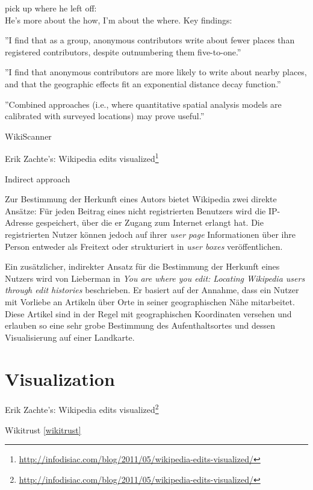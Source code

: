 
\begin{todos}
    \item pick up where he left off:  
    \\ He's more about the how, I'm about the where. Key findings:
    \item ''I find that as a group, anonymous contributors write about fewer places than registered contributors, despite outnumbering them five-to-one.'' \cite{hardy2011volunteered}
    \item ''I find that anonymous contributors are more likely to write about
nearby places, and that the geographic effects fit an exponential distance decay
function.'' \cite{hardy2011volunteered}
    \item ''Combined approaches (i.e., where quantitative spatial analysis models
are calibrated with surveyed locations) may prove useful.''  \cite[p. 85]{hardy2011volunteered}
    \item WikiScanner
    \item Erik Zachte's: Wikipedia edits visualized\footnote{\url{http://infodisiac.com/blog/2011/05/wikipedia-edits-visualized/}}
    \item Indirect approach 
\end{todos}

Zur Bestimmung der Herkunft eines Autors bietet Wikipedia zwei direkte Ansätze: 
Für jeden Beitrag eines nicht registrierten Benutzers wird die IP-Adresse gespeichert, über die er Zugang zum Internet erlangt hat. 
Die registrierten Nutzer können jedoch auf ihrer \emph{user page} Informationen über ihre Person entweder als Freitext oder strukturiert in \emph{user boxes} veröffentlichen.

Ein zusätzlicher, indirekter Ansatz für die Bestimmung der Herkunft eines Nutzers wird von Lieberman in \emph{You are where you edit: Locating Wikipedia users through edit histories}\cite{lieberman2009you} beschrieben.
Er basiert auf der Annahme, dass ein Nutzer mit Vorliebe an Artikeln über Orte in seiner geographischen Nähe mitarbeitet. 
Diese Artikel sind in der Regel mit geographischen Koordinaten versehen und erlauben so eine sehr grobe Bestimmung des Aufenthaltsortes und dessen Visualisierung auf einer Landkarte.


\section{Visualization}\label{sec:visualization}


\begin{todos}
    \item Erik Zachte's: Wikipedia edits visualized\footnote{\url{http://infodisiac.com/blog/2011/05/wikipedia-edits-visualized/}}
    \item Wikitrust \ref{wikitrust}
\end{todos}
